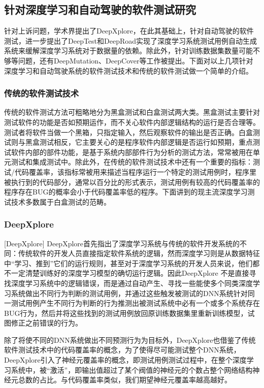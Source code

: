 \subsection{针对深度学习和自动驾驶的软件测试研究}

针对上诉问题，学术界提出了DeepXplore，在此其基础上，针对自动驾驶的软件测试，进一步提出了DeepTest和DeepRoad实现了深度学习系统测试用例自动生成系统来缓解深度学习系统对于数据量的依赖。除此外，针对训练数据集数量可能不够等问题，还有DeepMutation\cite{DeepMutation}、DeepCover\cite{DeepCover}等工作被提出。下面对以上几项针对深度学习和自动驾驶系统的软件测试技术和传统的软件测试做一个简单的介绍。

\subsubsection{传统的软件测试技术}

传统的软件测试方法可粗略地分为黑盒测试和白盒测试两大类。黑盒测试主要针对测试软件的功能是否如预期运作，而不关心软件内部逻辑结构的运行是否合理等。测试者将软件当做一个黑箱，只指定输入，然后观察软件的输出是否正确。白盒测试则与黑盒测试相反，它主要关心的是程序软件内部逻辑是否运行如预期，重点测试软件内部的部件功能，是基于系统内部部件行为分析的测试方法，常常被用在单元测试和集成测试中。除此外，在传统的软件测试技术中还有一个重要的指标：测试/代码覆盖率，该指标常被用来描述当程序运行一个特定的测试用例时，程序里被执行到的代码部分，通常以百分比的形式表示，测试用例有较高的代码覆盖率的程序存在BUG的概率会小于代码覆盖率低的程序。下面讲到的现主流深度学习测试技术多数属于白盒测试的范畴。

\subsubsection{DeepXplore}[DeepXplore]
DeepXplore首先指出了深度学习系统与传统的软件开发系统的不同：传统软件的开发人员直接指定软件系统的逻辑，然而深度学习则是从数据特征中“学习、推到”它们的运行规则，甚至对于深度学习系统的开发人员来说，他们都不一定清楚训练好的深度学习模型的确切运行逻辑。因此DeepXplore
不是直接寻找深度学习系统中的逻辑错误，而是通过自动产生、寻找一些能使多个同类深度学习系统做出不同行为判断的测试用例，并通过这些触发被测试的DNN系统针对同一测试用例产生不同行为判断的行为推测出被测试系统中必有一个或多个系统存在BUG行为，然后并将这些找到的测试用例放回原训练数据集里重新训练模型，试图修正之前错误的行为。

除了将使不同的DNN系统做出不同预测行为为目标外，DeepXplore也借鉴了传统软件测试技术中的代码覆盖率的概念，为了使得尽可能测试整个DNN系统，DeepXplore引入了神经元覆盖率的概念，即测试用例测试过程中，在整个深度学习系统中，被“激活”，即输出值超过了某个阀值的神经元的个数占整个网络结构神经元总数的占比。与代码覆盖率类似，我们期望神经元覆盖率越高越好。

